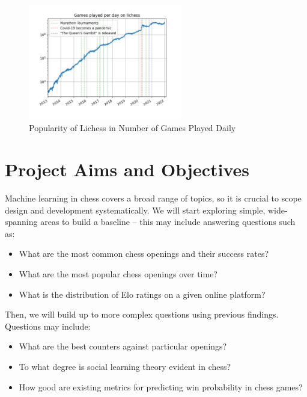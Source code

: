 \documentclass[%
 superscriptaddress,
showpacs,preprintnumbers,
 amsmath,
 amssymb,
 aps,
 pra,
showkeys,
onecolumn,
notitlepage,
11pt,
tightenlines      %
]{revtex4-1}
\begin{document}
\begin{figure}[h]
    \caption{Popularity of Lichess in Number of Games Played Daily \cite{chessOpeningStats}}
    \begin{center}
    \includegraphics[width=0.6\textwidth]{images/Lichess Number of Games Played Per Day.png}
    \end{center}
\end{figure}

\section{Project Aims and Objectives}
Machine learning in chess covers a broad range of topics, so it is crucial to scope design and development systematically. We will start exploring simple, wide-spanning areas to build a baseline -- this may include answering questions such as:

\begin{itemize}
    \setlength\itemsep{0em}
    \item What are the most common chess openings and their success rates?
    \item What are the most popular chess openings over time?
    \item What is the distribution of Elo ratings on a given online platform?
\end{itemize}

Then, we will build up to more complex questions using previous findings. Questions may include:
\begin{itemize}
    \setlength\itemsep{0em}
    \item What are the best counters against particular openings?
    \item To what degree is social learning theory evident in chess?
    \item How good are existing metrics for predicting win probability in chess games?
\end{itemize}
\end{document}
